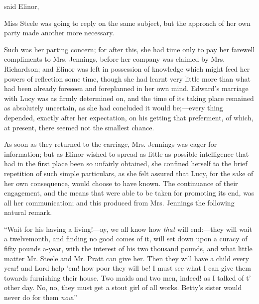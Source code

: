  said Elinor, 

Miss Steele was going to reply on the same subject, but the approach of her own party made another more necessary.


Such was her parting concern; for after this, she had time only to pay her farewell compliments to Mrs. Jennings, before her company was claimed by Mrs. Richardson; and Elinor was left in possession of knowledge which might feed her powers of reflection some time, though she had learnt very little more than what had been already foreseen and foreplanned in her own mind. Edward's marriage with Lucy was as firmly determined on, and the time of its taking place remained as absolutely uncertain, as she had concluded it would be;---every thing depended, exactly after her expectation, on his getting that preferment, of which, at present, there seemed not the smallest chance.

As soon as they returned to the carriage, Mrs. Jennings was eager for information; but as Elinor wished to spread as little as possible intelligence that had in the first place been so unfairly obtained, she confined herself to the brief repetition of such simple particulars, as she felt assured that Lucy, for the sake of her own consequence, would choose to have known. The continuance of their engagement, and the means that were able to be taken for promoting its end, was all her communication; and this produced from Mrs. Jennings the following natural remark.

“Wait for his having a living!---ay, we all know how {\em that} will end:---they will wait a twelvemonth, and finding no good comes of it, will set down upon a curacy of fifty pounds a-year, with the interest of his two thousand pounds, and what little matter Mr. Steele and Mr. Pratt can give her. Then they will have a child every year! and Lord help 'em! how poor they will be! I must see what I can give them towards furnishing their house. Two maids and two men, indeed! as I talked of t' other day. No, no, they must get a stout girl of all works. Betty's sister would never do for them {\em now}.”

